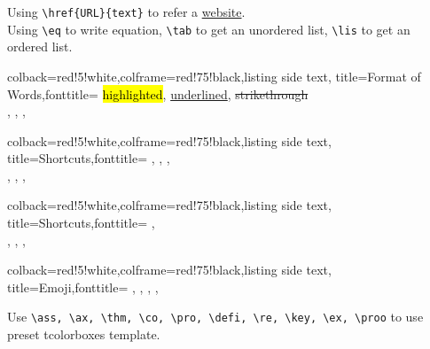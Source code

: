 \documentclass[12pt]{report}
\begin{document}
\no Using \verb=\href{URL}{text}= to refer a \href{EurekaTangChen.github.io}{website}.\\
\no Using \verb=\eq= to write equation, \verb=\tab= to get an unordered list,
\verb=\lis= to get an ordered list.\\
 \label{eq:Example}

\begin{tcblisting}{colback=red!5!white,colframe=red!75!black,listing side text,
        title=Format of Words,fonttitle=\bfseries}
    \hl{highlighted}, \ul{underlined}, \st{strikethrough}\\
    , , , 
\end{tcblisting}
\begin{tcblisting}{colback=red!5!white,colframe=red!75!black,listing side text,
        title=Shortcuts,fonttitle=\bfseries}
    \RR, \NN, \ZZ, \QQ\\
    \bA, \bB, \bC, \bD
\end{tcblisting}
\begin{tcblisting}{colback=red!5!white,colframe=red!75!black,listing side text,
        title=Shortcuts,fonttitle=\bfseries}
    , \\
    \cA, \cB, \cC, \cD
\end{tcblisting}
\begin{tcblisting}{colback=red!5!white,colframe=red!75!black,listing side text,
        title=Emoji,fonttitle=\bfseries}
    \emogood, \emobad, \emocool, \emoheart, \emotree
\end{tcblisting}

\no Use \verb=\ass, \ax, \thm, \co, \pro, \defi, \re, \key, \ex, \proo= to
\no use preset tcolorboxes template.
 \label{ax:Example}
 \label{pro:Example}
\end{document}
